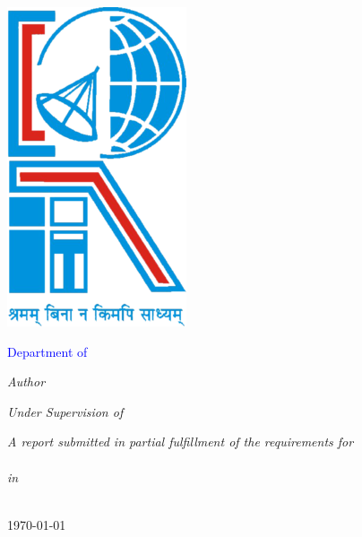 \documentclass[
11pt, english, singlespacing, headsepline,oneside]{Documantation}
\author{Prashant Kumar Prasad and Pamela Banerjee}
\begin{document}
\frontmatter

\pagestyle{plain}

\begin{titlepage}
	\begin{center}
		\includegraphics{logo}\\
		{\scshape\LARGE \textcolor{blue}{\univname}\par}
		\textcolor{blue}{Department of {\deptname}\\ {\addressname} }
		\vspace{1cm}
		
		{\huge \ttitle\par}\vspace{3cm}	
		\emph{Author}\\\bigskip
		
		\textcolor{blue}{\authordisc}
		\vspace{1cm}
				
		\emph{Under Supervision of} \\ \bigskip
		\textcolor{blue}{\supervisordisc}
		 
		\vfill
		
		\large \textit{
			A report submitted in partial fulfillment of the requirements for \\
			\degreename}\\[0.1cm]
		\textit{in}\\[0.1cm]
		\deptname\\[2cm]
		 
		\vfill
		
		{\large \today}\\
		\addressname
	\end{center}
\end{titlepage}
\end{document}
